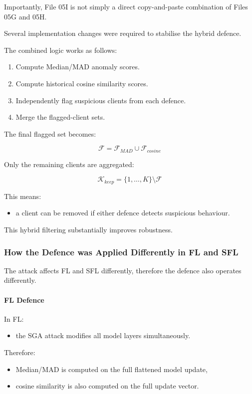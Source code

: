 Importantly, File 05I is not simply a direct copy-and-paste combination of Files 05G and 05H.

Several implementation changes were required to stabilise the hybrid defence.

The combined logic works as follows:

\begin{enumerate}
    \item Compute Median/MAD anomaly scores.
    \item Compute historical cosine similarity scores.
    \item Independently flag suspicious clients from each defence.
    \item Merge the flagged-client sets.
\end{enumerate}

The final flagged set becomes:

\[
\mathcal{F}
=
\mathcal{F}_{MAD}
\cup
\mathcal{F}_{cosine}
\]

Only the remaining clients are aggregated:

\[
\mathcal{K}_{keep}
=
\{1,\dots,K\}
\setminus
\mathcal{F}
\]

This means:
\begin{itemize}
    \item a client can be removed if either defence detects suspicious behaviour.
\end{itemize}

This hybrid filtering substantially improves robustness.

\subsubsection*{How the Defence was Applied Differently in FL and SFL}

The attack affects FL and SFL differently, therefore the defence also operates differently.

\paragraph{FL Defence}

In FL:
\begin{itemize}
    \item the SGA attack modifies all model layers simultaneously.
\end{itemize}

Therefore:
\begin{itemize}
    \item Median/MAD is computed on the full flattened model update,
    \item cosine similarity is also computed on the full update vector.
\end{itemize}

